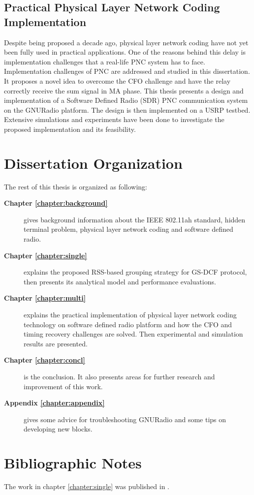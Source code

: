 \subsection{Practical Physical Layer Network Coding Implementation}
Despite being proposed a decade ago, physical layer network coding have not yet been fully used in practical applications. One of the reasons behind this delay is implementation challenges that a real-life PNC system has to face. Implementation challenges of PNC are addressed and studied in this dissertation.
It proposes a novel idea to overcome the CFO challenge and have the relay correctly receive the sum signal in MA phase. This thesis presents a design and implementation of a Software Defined Radio (SDR) PNC communication system on the GNURadio platform. The design is then implemented on a USRP testbed. Extensive simulations and experiments have been done to investigate the proposed implementation and its feasibility. 



\section{Dissertation Organization}

The rest of this thesis is organized as following:
\begin{description}
\item[\textbf{Chapter \ref{chapter:background}}] gives background information about the IEEE 802.11ah standard, hidden terminal problem, physical layer network coding and software defined radio.
\item[\textbf{Chapter \ref{chapter:single}}] explains the proposed RSS-based grouping strategy for GS-DCF protocol, then presents its analytical model and performance evaluations.
\item[\textbf{Chapter \ref{chapter:multi}}] explains the practical implementation of physical layer network coding technology on software defined radio platform and how the CFO and timing recovery challenges are solved. Then experimental and simulation results are presented.
\item[\textbf{Chapter \ref{chapter:concl}}] is the conclusion. It also presents areas for further research and improvement of this work.
\item[\textbf{Appendix \ref{chapter:appendix}}] gives some advice for troubleshooting GNURadio and some tips on developing new blocks. 
\end{description}


\section{Bibliographic Notes}
The work in chapter \ref{chapter:single} was published in \cite{ghasemiahmadi2017rss}. 